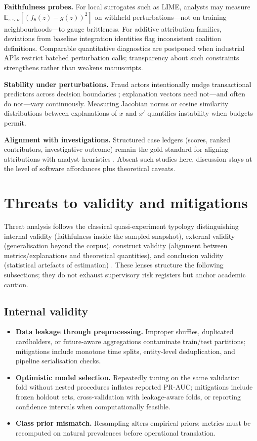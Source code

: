 \textbf{Faithfulness probes.} For local surrogates such as LIME, analysts may measure $\mathbb{E}_{z \sim \nu}[(f_\theta(z)-g(z))^2]$ on withheld perturbations—not on training neighbourhoods—to gauge brittleness. For additive attribution families, deviations from baseline integration identities flag inconsistent coalition definitions. Comparable quantitative diagnostics are postponed when industrial APIs restrict batched perturbation calls; transparency about such constraints strengthens rather than weakens manuscripts.

\textbf{Stability under perturbations.} Fraud actors intentionally nudge transactional predictors across decision boundaries \cite{lucas_jurgovsky_ccfraud_survey2020}; explanation vectors need not—and often do not—vary continuously. Measuring Jacobian norms or cosine similarity distributions between explanations of $x$ and $x'$ quantifies instability when budgets permit.

\textbf{Alignment with investigations.} Structured case ledgers (scores, ranked contributors, investigative outcome) remain the gold standard for aligning attributions with analyst heuristics \cite{doshi_velez_kim_interpretability_2017}. Absent such studies here, discussion stays at the level of software affordances plus theoretical caveats.

\section{Threats to validity and mitigations}
Threat analysis follows the classical quasi-experiment typology distinguishing internal validity (faithfulness inside the sampled snapshot), external validity (generalisation beyond the corpus), construct validity (alignment between metrics/explanations and theoretical quantities), and conclusion validity (statistical artefacts of estimation) \cite{fraud_handbook,xai_survey}. These lenses structure the following subsections; they do not exhaust supervisory risk registers but anchor academic caution.

\subsection{Internal validity}
\begin{itemize}
    \item \textbf{Data leakage through preprocessing.} Improper shuffles, duplicated cardholders, or future-aware aggregations contaminate train/test partitions; mitigations include monotone time splits, entity-level deduplication, and pipeline serialisation checks.
    \item \textbf{Optimistic model selection.} Repeatedly tuning on the same validation fold without nested procedures inflates reported PR-AUC; mitigations include frozen holdout sets, cross-validation with leakage-aware folds, or reporting confidence intervals when computationally feasible.
    \item \textbf{Class prior mismatch.} Resampling alters empirical priors; metrics must be recomputed on natural prevalences before operational translation.
\end{itemize}

